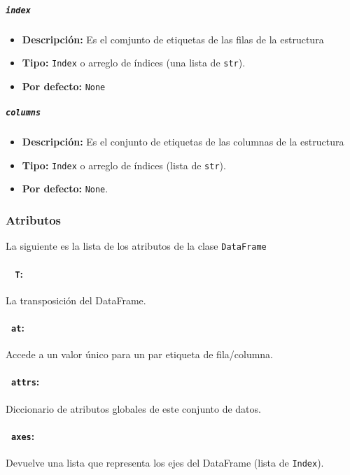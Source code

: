 \subparagraph{\texttt{index}}
\begin{itemize}
    \item \textbf{Descripción:} Es el comjunto de etiquetas de las filas de la
          estructura
    \item     \textbf{Tipo:} \texttt{Index} o arreglo de índices (una lista de
          \texttt{str}).
    \item     \textbf{Por defecto:} \texttt{None}
\end{itemize}

\subparagraph{\texttt{columns}}
\begin{itemize}
    \item \textbf{Descripción:} Es el conjunto de etiquetas de las columnas de
          la estructura
    \item \textbf{Tipo:} \texttt{Index} o arreglo de índices (lista de
          \texttt{str}).
    \item \textbf{Por defecto:} \texttt{None}.
\end{itemize}

\subsubsection{Atributos}

La siguiente es la lista de los atributos de la clase \texttt{DataFrame}

\paragraph{~\hspace{2em} \texttt{T}:} La transposición del DataFrame.

\paragraph{~\hspace{2em}\texttt{at}:} Accede a un valor único para un par
etiqueta de fila/columna.

\paragraph{~\hspace{2em}\texttt{attrs}:} Diccionario de atributos globales de
este conjunto de datos.

\paragraph{~\hspace{2em}\texttt{axes}:} Devuelve una lista que representa los
ejes del DataFrame (lista de \texttt{Index}).


